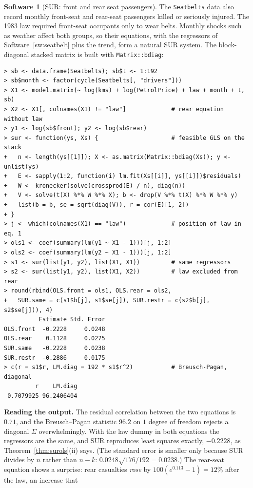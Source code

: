 \documentclass[11pt,a4paper]{article}
\numberwithin{equation}{section}
\theoremstyle{definition}
\newtheorem{software}[thm]{Software}
\begin{document}
\begin{software}[SUR: front and rear seat passengers]
\label{sw:sur}
The \texttt{Seatbelts} data also record monthly front-seat and rear-seat passengers killed or seriously injured. The 1983 law required front-seat
occupants only to wear belts. Monthly shocks such as weather affect both groups, so their equations, with the regressors of Software~\ref{sw:seatbelt}
plus the trend, form a natural SUR system. The block-diagonal stacked matrix is built with \texttt{Matrix::bdiag}:
{\small\begin{verbatim}
> sb <- data.frame(Seatbelts); sb$t <- 1:192
> sb$month <- factor(cycle(Seatbelts[, "drivers"]))
> X1 <- model.matrix(~ log(kms) + log(PetrolPrice) + law + month + t, sb)
> X2 <- X1[, colnames(X1) != "law"]             # rear equation without law
> y1 <- log(sb$front); y2 <- log(sb$rear)
> sur <- function(ys, Xs) {                     # feasible GLS on the stack
+   n <- length(ys[[1]]); X <- as.matrix(Matrix::bdiag(Xs)); y <- unlist(ys)
+   E <- sapply(1:2, function(i) lm.fit(Xs[[i]], ys[[i]])$residuals)
+   W <- kronecker(solve(crossprod(E) / n), diag(n))
+   V <- solve(t(X) %*% W %*% X); b <- drop(V %*% t(X) %*% W %*% y)
+   list(b = b, se = sqrt(diag(V)), r = cor(E)[1, 2])
+ }
> j <- which(colnames(X1) == "law")             # position of law in eq. 1
> ols1 <- coef(summary(lm(y1 ~ X1 - 1)))[j, 1:2]
> ols2 <- coef(summary(lm(y2 ~ X1 - 1)))[j, 1:2]
> s1 <- sur(list(y1, y2), list(X1, X1))         # same regressors
> s2 <- sur(list(y1, y2), list(X1, X2))         # law excluded from rear
> round(rbind(OLS.front = ols1, OLS.rear = ols2,
+   SUR.same = c(s1$b[j], s1$se[j]), SUR.restr = c(s2$b[j], s2$se[j])), 4)
          Estimate Std. Error
OLS.front  -0.2228     0.0248
OLS.rear    0.1128     0.0275
SUR.same   -0.2228     0.0238
SUR.restr  -0.2886     0.0175
> c(r = s1$r, LM.diag = 192 * s1$r^2)           # Breusch-Pagan, diagonal
         r    LM.diag 
 0.7079925 96.2406404 
\end{verbatim}}
\textbf{Reading the output.} The residual correlation between the two equations is $0.71$, and the Breusch--Pagan statistic $96.2$ on $1$ degree of freedom
rejects a diagonal $\Sigma$ overwhelmingly. With the law dummy in both equations the regressors are the same, and SUR reproduces least squares exactly,
$-0.2228$, as Theorem~\ref{thm:surols}(ii) says. (The standard error is smaller only because SUR divides by $n$ rather than $n - k$:
$0.0248\sqrt{176/192} = 0.0238$.) The rear-seat equation shows a surprise: rear casualties \emph{rose} by $100(e^{0.113} - 1) = 12\%$ after the law, an increase that

\end{software}
\end{document}
